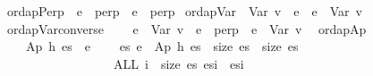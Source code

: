 \documentclass{llncs}
\newenvironment{isacode}
{\begin{list}{}{
\setlength{\leftmargin}{4pt}
\setlength{\rightmargin}{0pt}
\setlength{\listparindent}{0pt}\raggedright
\setlength{\itemsep}{0pt}
\setlength{\parsep}{0pt}
\normalfont\ttfamily }\item[]}
{\end{list}}
\begin{document}
\medskip

\begin{minipage}{\linewidth}
\begin{isacode}
\isamarkupfalse \ ordapPerp{\isacharcolon}\ \ {\isachardoublequoteopen}e\ {\isasymsqsubseteq}\ perp{\isachardoublequoteclose}\ \ {\isachardoublequoteopen}e\ {\isacharequal}\ perp{\isachardoublequoteclose}
\isanewline
{}\isamarkupfalse \ ordapVar{\isacharcolon}\ \ {\isachardoublequoteopen}Var\ v\ {\isasymsqsubseteq}\ e{\isachardoublequoteclose}\ \ {\isachardoublequoteopen}e\ {\isacharequal}\ Var\ v{\isachardoublequoteclose}\isanewline
{}\isamarkupfalse \ ordapVar{\isacharunderscore}converse{\isacharcolon}\isanewline
\ \ \ \ {\isachardoublequoteopen}e\ {\isasymsqsubseteq}\ Var\ v{\isachardoublequoteclose}\ \ {\isachardoublequoteopen}e\ {\isacharequal}\ perp\ {\isasymor}\ e\ {\isacharequal}\ Var\ v{\isachardoublequoteclose}\ \isanewline
{}\isamarkupfalse \ ordapAp{\isacharcolon}\isanewline
\ \ \ \ {\isachardoublequoteopen}Ap\ h\ es\ {\isasymsqsubseteq}\ e{\isacharprime}{\isachardoublequoteclose}\isanewline
\ \ \ \ {\isachardoublequoteopen}{\isasymexists}es{\isacharprime}{\isachardot}\ e{\isacharprime}\ {\isacharequal}\ Ap\ h\ es{\isacharprime}\ {\isasymand}\ size\ es\ {\isacharequal}\ size\ es{\isacharprime}\isanewline
\ \ \ \ \ \ \ \ \ \ \ \ \ \ \ \ \ {\isasymand}\ {\isacharparenleft}ALL\ i\ {\isacharless}\ size\ es{\isachardot}\ es{\isacharbang}i\ {\isasymsqsubseteq}\ es{\isacharprime}{\isacharbang}i{\isacharparenright}{\isachardoublequoteclose}\isanewline

\end{isacode}
\end{minipage}
\end{document}
